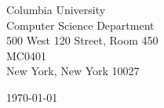 \begin{minipage}{0.49\textwidth}
\begin{flushleft}
\noindent
Columbia University\\
Computer Science Department\\
500 West 120 Street, Room 450\\
MC0401\\
New York, New York 10027
\end{flushleft}
\end{minipage}
\begin{minipage}{0.47\textwidth}
\begin{flushright}
\today
\end{flushright}
\end{minipage} \\

\newcommand{\univ}{Columbia University}
\newcommand{\univshort}{Columbia}
\newcommand{\degree}{Ph.D.}
\newcommand{\dept}{Computer Science}
